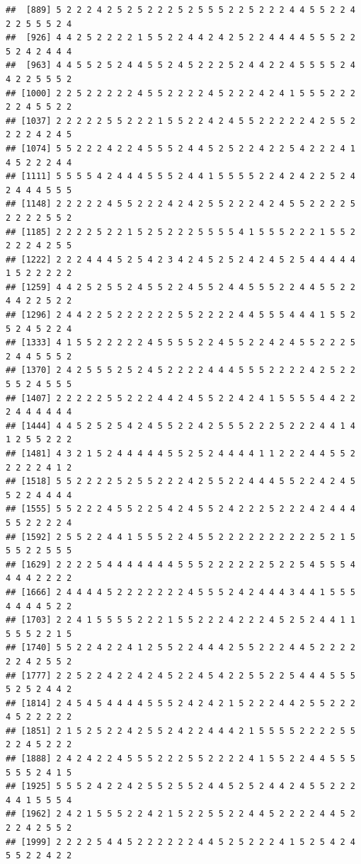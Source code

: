 \documentclass[
]{book}
\begin{document}
\begin{verbatim}
##  [889] 5 2 2 2 4 2 5 2 5 2 2 2 5 2 5 5 5 2 2 5 2 2 2 4 4 5 5 2 2 4 2 2 5 5 5 2 4
##  [926] 4 4 2 5 2 2 2 2 1 5 5 2 2 4 4 2 4 2 5 2 2 4 4 4 4 5 5 5 2 2 5 2 4 2 4 4 4
##  [963] 4 4 5 5 2 5 2 4 4 5 5 2 4 5 2 2 2 5 2 4 4 2 2 4 5 5 5 5 2 4 4 2 2 5 5 5 2
## [1000] 2 2 5 2 2 2 2 2 4 5 5 2 2 2 2 4 5 2 2 2 4 2 4 1 5 5 5 2 2 2 2 2 4 5 5 2 2
## [1037] 2 2 2 2 2 5 5 2 2 2 1 5 5 2 2 4 2 4 5 5 2 2 2 2 2 4 2 5 5 2 2 2 2 4 2 4 5
## [1074] 5 5 2 2 2 4 2 2 4 5 5 5 2 4 4 5 2 5 2 2 4 2 2 5 4 2 2 2 4 1 4 5 2 2 2 4 4
## [1111] 5 5 5 5 4 2 4 4 4 5 5 5 2 4 4 1 5 5 5 5 2 2 4 2 4 2 2 5 2 4 2 4 4 4 5 5 5
## [1148] 2 2 2 2 2 4 5 5 2 2 2 4 2 4 2 5 5 2 2 2 4 2 4 5 5 2 2 2 2 5 2 2 2 2 5 5 2
## [1185] 2 2 2 2 5 2 2 1 5 2 5 2 2 2 5 5 5 5 4 1 5 5 5 2 2 2 1 5 5 2 2 2 2 4 2 5 5
## [1222] 2 2 2 4 4 4 5 2 5 4 2 3 4 2 4 5 2 5 2 4 2 4 5 2 5 4 4 4 4 4 1 5 2 2 2 2 2
## [1259] 4 4 2 5 2 5 5 2 4 5 5 2 2 4 5 5 2 4 4 5 5 5 2 2 4 4 5 5 2 2 4 4 2 2 5 2 2
## [1296] 2 4 4 2 2 5 2 2 2 2 2 2 5 5 2 2 2 2 4 4 5 5 5 4 4 4 1 5 5 2 5 2 4 5 2 2 4
## [1333] 4 1 5 5 2 2 2 2 2 4 5 5 5 5 2 2 4 5 5 2 2 4 2 4 5 5 2 2 2 5 2 4 4 5 5 5 2
## [1370] 2 4 2 5 5 5 2 5 2 4 5 2 2 2 2 4 4 4 5 5 5 2 2 2 2 4 2 5 2 2 5 5 2 4 5 5 5
## [1407] 2 2 2 2 2 5 5 2 2 2 4 4 2 4 5 5 2 2 4 2 4 1 5 5 5 5 4 4 2 2 2 4 4 4 4 4 4
## [1444] 4 4 5 2 5 2 5 4 2 4 5 5 2 2 4 2 5 5 5 2 2 2 5 2 2 2 4 4 1 4 1 2 5 5 2 2 2
## [1481] 4 3 2 1 5 2 4 4 4 4 4 5 5 2 5 2 4 4 4 4 1 1 2 2 2 4 4 5 5 2 2 2 2 2 4 1 2
## [1518] 5 5 2 2 2 2 5 2 5 5 2 2 2 4 2 5 5 2 2 4 4 4 5 5 2 2 4 2 4 5 5 2 2 4 4 4 4
## [1555] 5 5 2 2 2 4 5 5 2 2 5 4 2 4 5 5 2 4 2 2 2 5 2 2 2 4 2 4 4 4 5 5 2 2 2 2 4
## [1592] 2 5 5 2 2 4 4 1 5 5 5 2 2 4 5 5 2 2 2 2 2 2 2 2 2 2 5 2 1 5 5 5 2 2 5 5 5
## [1629] 2 2 2 2 5 4 4 4 4 4 4 4 5 5 5 2 2 2 2 2 2 5 2 2 5 4 5 5 5 4 4 4 4 2 2 2 2
## [1666] 2 4 4 4 4 5 2 2 2 2 2 2 2 4 5 5 5 2 4 2 4 4 4 3 4 4 1 5 5 5 4 4 4 4 5 2 2
## [1703] 2 2 4 1 5 5 5 5 2 2 2 1 5 5 2 2 2 4 2 2 2 4 5 2 5 2 4 4 1 1 5 5 5 2 2 1 5
## [1740] 5 5 2 2 4 2 2 4 1 2 5 5 2 2 4 4 4 2 5 5 2 2 2 4 4 5 2 2 2 2 2 2 4 2 5 5 2
## [1777] 2 2 5 2 2 4 2 2 4 2 4 5 2 2 4 5 4 2 2 5 5 2 2 5 4 4 4 5 5 5 5 2 5 2 4 4 2
## [1814] 2 4 5 4 5 4 4 4 4 5 5 5 2 4 2 4 2 1 5 2 2 2 4 4 2 5 5 2 2 2 4 5 2 2 2 2 2
## [1851] 2 1 5 2 5 2 2 4 2 5 5 2 4 2 2 4 4 4 2 1 5 5 5 5 2 2 2 2 5 5 2 2 4 5 2 2 2
## [1888] 2 4 2 4 2 2 4 5 5 5 2 2 2 5 5 2 2 2 2 4 1 5 5 2 2 4 4 5 5 5 5 5 5 2 4 1 5
## [1925] 5 5 5 2 4 2 2 4 2 5 5 2 5 5 2 4 4 5 2 5 2 4 4 2 4 5 5 2 2 2 4 4 1 5 5 5 4
## [1962] 2 4 2 1 5 5 5 2 2 4 2 1 5 2 2 5 5 2 2 4 4 5 2 2 2 2 4 4 5 2 2 2 4 2 5 5 2
## [1999] 2 2 2 2 5 4 4 5 2 2 2 2 2 2 4 4 5 2 5 2 2 2 4 1 5 2 5 4 2 4 5 5 2 2 4 2 2

\end{verbatim}
\end{document}
